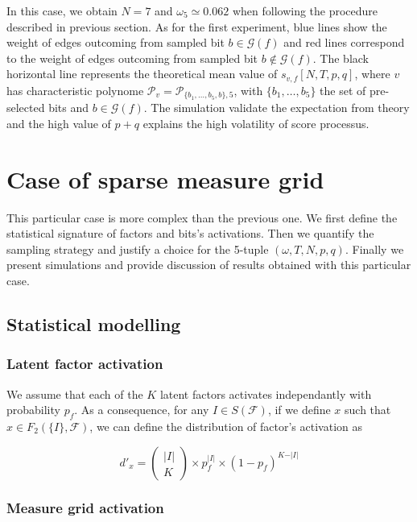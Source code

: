 \documentclass[a4paper, 11pt]{article}
\begin{document}
In this case, we obtain $N=7$ and $\omega_5 \simeq 0.062$ when following the procedure described in previous section. As for the first experiment, blue lines show the weight of edges outcoming from sampled bit $b \in \mathcal{G}(f)$ and red lines correspond to the weight of edges outcoming from sampled bit $b \notin \mathcal{G}(f)$. The black horizontal line represents the theoretical mean value of $s_{v, f}[N, T, p, q]$, where $v$ has characteristic polynome $\mathcal{P}_v = \mathcal{P}_{\{b_1, \ldots, b_5, b\}, 5}$, with $\{b_1, \ldots, b_5\}$ the set of pre-selected bits and $b \in \mathcal{G}(f)$. The simulation validate the expectation from theory and the high value of $p+q$ explains the high volatility of score processus.

\section{Case of sparse measure grid}

This particular case is more complex than the previous one. We first define the statistical signature of factors and bits's activations. Then we quantify the sampling strategy and justify a choice for the 5-tuple $(\omega, T, N, p, q)$. Finally we present simulations and provide discussion of results obtained with this particular case.

\subsection{Statistical modelling}


\subsubsection*{Latent factor activation}

We assume that each of the $K$ latent factors activates independantly with probability $p_f$. As a consequence, for any $I \in S(\mathcal{F})$, if we define $x$ such that $x \in F_2 (\{I\}, \mathcal{F})$, we can define the distribution of factor's activation as 

\begin{equation*}
d'_x = \begin{pmatrix} \vert I \vert \\ K \end{pmatrix} \times p_f^{\vert I \vert} \times (1-p_f)^{K-\vert I \vert} 
\end{equation*}


\subsubsection*{Measure grid activation}
\end{document}
